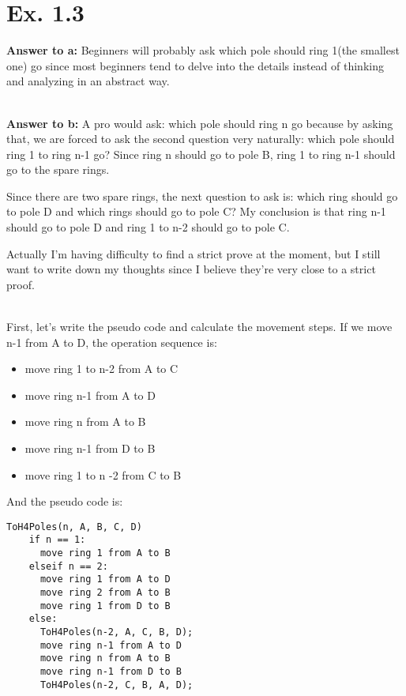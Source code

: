 \documentclass[a4paper,11pt]{article}
\theoremstyle{mytheor}
\begin{document}
\section*{Ex. 1.3}

\textbf{Answer to a:} Beginners will probably ask which pole should ring 1(the smallest one) go since most beginners tend to delve into the details instead of thinking and analyzing in an abstract way.

~\\
\noindent\textbf{Answer to b:} A pro would ask: which pole should ring n go because by asking that, we are forced to ask the second question very naturally: which pole should ring 1 to ring n-1 go? Since ring n should go to pole B, ring 1 to ring n-1 should go to the spare rings.

Since there are two spare rings, the next question to ask is: which ring should go to pole D and which rings should go to pole C?
My conclusion is that ring n-1 should go to pole D and ring 1 to n-2 should go to pole C. 

Actually I'm having difficulty to find a strict prove at the moment, but I still want to write down my thoughts since I believe they're very close to a strict proof.

~\\
First, let's write the pseudo code and calculate the movement steps. If we move n-1 from A to D, the operation sequence is:
\begin{itemize}
    \item move ring 1 to n-2 from A to C
    \item move ring n-1 from A to D
    \item move ring n from A to B
    \item move ring n-1 from D to B
    \item move ring 1 to n -2 from C to B
\end{itemize}

And the pseudo code is:
\begin{lstlisting}[label={list:fourth},caption=steps listing -- Towers of Hanoi with four poles.]
ToH4Poles(n, A, B, C, D)
    if n == 1:
      move ring 1 from A to B
    elseif n == 2:
      move ring 1 from A to D
      move ring 2 from A to B
      move ring 1 from D to B
    else:
      ToH4Poles(n-2, A, C, B, D);
      move ring n-1 from A to D
      move ring n from A to B
      move ring n-1 from D to B
      ToH4Poles(n-2, C, B, A, D);
\end{lstlisting}
\end{document}
